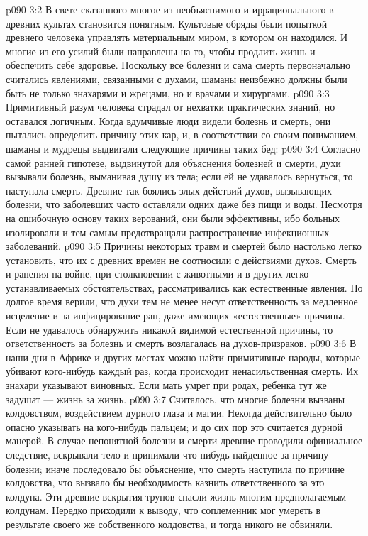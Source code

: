 \vs p090 3:2 В свете сказанного многое из необъяснимого и иррационального в древних культах становится понятным. Культовые обряды были попыткой древнего человека управлять материальным миром, в котором он находился. И многие из его усилий были направлены на то, чтобы продлить жизнь и обеспечить себе здоровье. Поскольку все болезни и сама смерть первоначально считались явлениями, связанными с духами, шаманы неизбежно должны были быть не только знахарями и жрецами, но и врачами и хирургами.
\vs p090 3:3 Примитивный разум человека страдал от нехватки практических знаний, но оставался логичным. Когда вдумчивые люди видели болезнь и смерть, они пытались определить причину этих кар, и, в соответствии со своим пониманием, шаманы и мудрецы выдвигали следующие причины таких бед:
\vs p090 3:4 \bibnobreakspace {} Согласно самой ранней гипотезе, выдвинутой для объяснения болезней и смерти, духи вызывали болезнь, выманивая душу из тела; если ей не удавалось вернуться, то наступала смерть. Древние так боялись злых действий духов, вызывающих болезни, что заболевших часто оставляли одних даже без пищи и воды. Несмотря на ошибочную основу таких верований, они были эффективны, ибо больных изолировали и тем самым предотвращали распространение инфекционных заболеваний.
\vs p090 3:5 \bibnobreakspace {} Причины некоторых травм и смертей было настолько легко установить, что их с древних времен не соотносили с действиями духов. Смерть и ранения на войне, при столкновении с животными и в других легко устанавливаемых обстоятельствах, рассматривались как естественные явления. Но долгое время верили, что духи тем не менее несут ответственность за медленное исцеление и за инфицирование ран, даже имеющих «естественные» причины. Если не удавалось обнаружить никакой видимой естественной причины, то ответственность за болезнь и смерть возлагалась на духов\hyp{}призраков.
\vs p090 3:6 В наши дни в Африке и других местах можно найти примитивные народы, которые убивают кого\hyp{}нибудь каждый раз, когда происходит ненасильственная смерть. Их знахари указывают виновных. Если мать умрет при родах, ребенка тут же задушат --- жизнь за жизнь.
\vs p090 3:7 \bibnobreakspace {} Считалось, что многие болезни вызваны колдовством, воздействием дурного глаза и магии. Некогда действительно было опасно указывать на кого\hyp{}нибудь пальцем; и до сих пор это считается дурной манерой. В случае непонятной болезни и смерти древние проводили официальное следствие, вскрывали тело и принимали что\hyp{}нибудь найденное за причину болезни; иначе последовало бы объяснение, что смерть наступила по причине колдовства, что вызвало бы необходимость казнить ответственного за это колдуна. Эти древние вскрытия трупов спасли жизнь многим предполагаемым колдунам. Нередко приходили к выводу, что соплеменник мог умереть в результате своего же собственного колдовства, и тогда никого не обвиняли.
